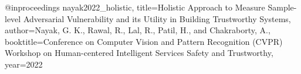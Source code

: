 @inproceedings{
nayak2022_holistic,
title={Holistic Approach to Measure Sample-level Adversarial Vulnerability and its
Utility in Building Trustworthy Systems},
author={Nayak, G. K., Rawal, R., Lal, R., Patil, H., and Chakraborty, A.},
booktitle={Conference on Computer Vision and Pattern Recognition (CVPR) Workshop on Human-centered Intelligent Services Safety and Trustworthy},
year={2022}
}
